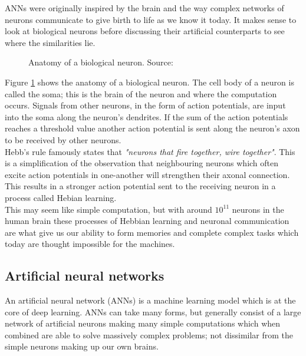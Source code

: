 \documentclass[
    author={Kai Hulme},
    supervisor={Dr Jon Bird},
    degree={BSc},
    title={Generative Adversarial Networks as an Augmentation Technique},
    subtitle={for Alzheimer's Disease Detection in MRI Volumes},
    type={Research},
    year={2021} 
]{dissertation}
\begin{document}
ANNs were originally inspired by the brain and the way complex networks of neurons communicate to give birth to life as we know it today. It makes sense to look at biological neurons before discussing their artificial counterparts to see where the similarities lie. \\

\begin{figure}[t]
\centering
{}
\caption{Anatomy of a biological neuron. Source: \cite{geron2019hands}}
\label{neuron_anatomy}
\end{figure}

Figure \ref{neuron_anatomy} shows the anatomy of a biological neuron. The cell body of a neuron is called the soma; this is the brain of the neuron and where the computation occurs. Signals from other neurons, in the form of action potentials, are input into the soma along the neuron's dendrites. If the sum of the action potentials reaches a threshold value another action potential is sent along the neuron's axon to be received by other neurons. \\

Hebb's rule famously states that \textit{"neurons that fire together, wire together"}. This is a simplification of the observation that neighbouring neurons which often excite action potentials in one-another will strengthen their axonal connection. This results in a stronger action potential sent to the receiving neuron in a process called Hebian learning. \\

This may seem like simple computation, but with around $10^{11}$ neurons in the human brain these processes of Hebbian learning and neuronal communication are what give us our ability to form memories and complete complex tasks which today are thought impossible for the machines.
		
\subsection{Artificial neural networks}

An artificial neural network (ANNs) is a machine learning model which is at the core of deep learning. ANNs can take many forms, but generally consist of a large network of artificial neurons making many simple computations which when combined are able to solve massively complex problems; not dissimilar from the simple neurons making up our own brains.
\end{document}
